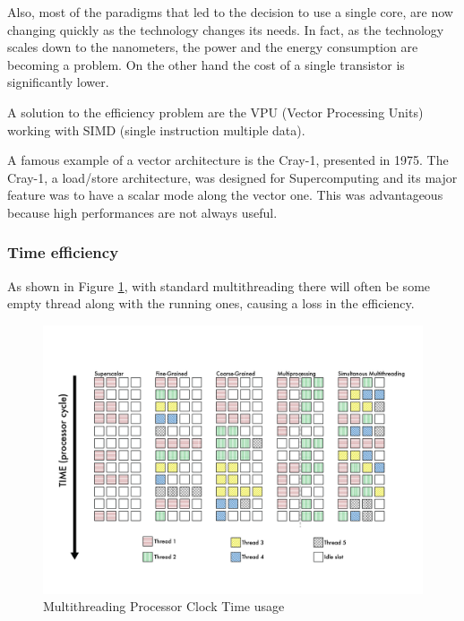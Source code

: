 Also, most of the paradigms that led to the decision to use a single core, are now changing quickly as the technology changes its needs.
In fact, as the technology scales down to the nanometers, the power and the energy consumption are becoming a problem. On the other hand the cost of a single transistor is significantly lower.


A solution to the efficiency problem are the VPU (Vector Processing Units) working with SIMD (single instruction multiple data).

A famous example of a vector architecture is the Cray-1, presented in 1975.
The Cray-1, a load/store architecture, was designed for Supercomputing and its major feature was to have a scalar mode along the vector one. This was advantageous because high performances are not always useful.

\subsubsection{Time efficiency}
As shown in Figure \ref{Multithreading}, with standard multithreading there will often be some empty thread along with the running ones, causing a loss in the efficiency.
\begin{figure}[H]
    \centering
    \includegraphics[scale = 0.5]{Chapter_1/img/threads.png}
    \caption{Multithreading Processor Clock Time usage  \cite{L15-Krste}}
    \label{Multithreading}
\end{figure}


